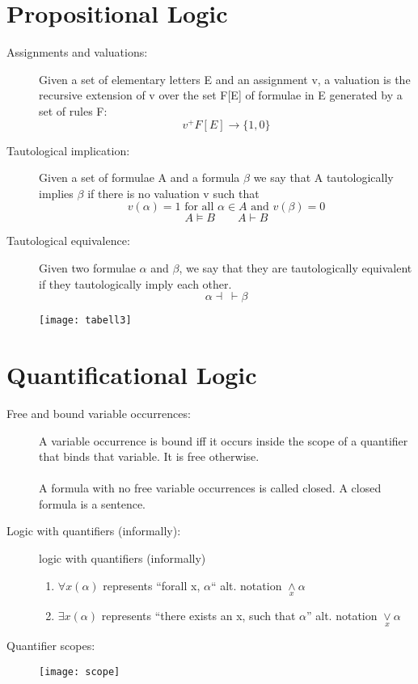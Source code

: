 \documentclass[12pt]{article}
\begin{document}
\section{Propositional Logic}
\begin{description}
\item[Assignments and valuations:] Given a set of elementary letters E and an assignment v, a valuation is the recursive extension of v over the set F[E] of formulae in E generated by a set of rules F: \[v^{+} F[E] \rightarrow  \{1,0\}\]

\item[Tautological implication:] Given a set of formulae A and a formula $\beta$ we say that A
tautologically implies $\beta$ if there is no valuation v such that \[v(\alpha) = 1 \textrm{ for all } \alpha \in A \textrm{ and } v(\beta) = 0\] \[A \models B \qquad A \vdash B\]

\item[Tautological equivalence:] Given two formulae $\alpha$ and $\beta$, we say that they are tautologically equivalent if they tautologically imply each other.\[\alpha \dashv \: \vdash \beta\]

\end{description}

\begin{figure}[htbp]
\hspace{-2cm}    
\texttt{[image: tabell3]}
\end{figure}

\section{Quantificational Logic}

\begin{description}
\item[Free and bound variable occurrences: ] A variable occurrence is bound iff it occurs inside the scope of a quantifier
that binds that variable. It is free otherwise. \\ \\
A formula with no free variable occurrences is called closed.
A closed formula is a sentence.

\item[Logic with quantifiers (informally):] logic with quantifiers (informally)
\begin{enumerate}
\item[] $\forall x(\alpha)$ represents “forall x, $\alpha$“ alt. notation $\underset{x}{\wedge} \alpha$
\item[] $\exists x(\alpha)$ represents “there exists an x, such that $\alpha$” alt. notation $\underset{x}{\vee}\alpha$
\end{enumerate}

\item[Quantifier scopes:]


\end{description}
\begin{figure}[h]
\centering 
\texttt{[image: scope]}
\end{figure}
\end{document}
